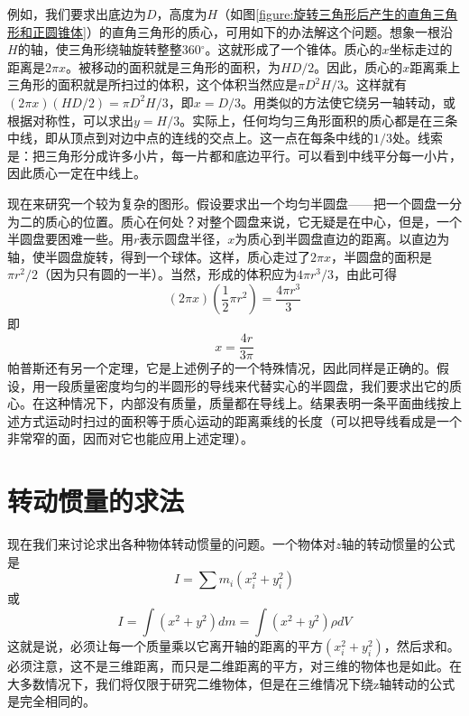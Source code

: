 例如，我们要求出底边为$D$，高度为$H$（如图\ref{figure:旋转三角形后产生的直角三角形和正圆锥体}）的直角三角形的质心，可用如下的办法解这个问题。想象一根沿$H$的轴，使三角形绕轴旋转整整360$^\circ$。这就形成了一个锥体。质心的$x$坐标走过的距离是$2\pi x$。被移动的面积就是三角形的面积，为$HD/2$。因此，质心的$x$距离乘上三角形的面积就是所扫过的体积，这个体积当然应是$\pi D^2H/3$。这样就有$(2\pi x)(HD/2)=\pi D^2H/3$，即$x=D/3$。用类似的方法使它绕另一轴转动，或根据对称性，可以求出$y=H/3$。实际上，任何均匀三角形面积的质心都是在三条中线，即从顶点到对边中点的连线的交点上。这一点在每条中线的$1/3$处。线索是：把三角形分成许多小片，每一片都和底边平行。可以看到中线平分每一小片，因此质心一定在中线上。

现在来研究一个较为复杂的图形。假设要求出一个均匀半圆盘——把一个圆盘一分为二的质心的位置。质心在何处？对整个圆盘来说，它无疑是在中心，但是，一个半圆盘要困难一些。用$r$表示圆盘半径，$x$为质心到半圆盘直边的距离。以直边为轴，使半圆盘旋转，得到一个球体。这样，质心走过了$2\pi x$，半圆盘的面积是$\pi r^2/2$（因为只有圆的一半）。当然，形成的体积应为$4\pi r^3/3$，由此可得
\begin{equation*}
    (2\pi x)\left (\frac{1}{2} \pi r^2 \right ) = \frac{4 \pi r^3}{3}
\end{equation*}
即
\begin{equation*}
    x=\frac{4r}{3\pi}
\end{equation*}
帕普斯还有另一个定理，它是上述例子的一个特殊情况，因此同样是正确的。假设，用一段质量密度均匀的半圆形的导线来代替实心的半圆盘，我们要求出它的质心。在这种情况下，内部没有质量，质量都在导线上。结果表明一条平面曲线按上述方式运动时扫过的面积等于质心运动的距离乘线的长度（可以把导线看成是一个非常窄的面，因而对它也能应用上述定理）。

\section{转动惯量的求法}

现在我们来讨论求出各种物体转动惯量的问题。一个物体对$z$轴的转动惯量的公式是
\begin{equation*}
    I=\sum m_i (x_i^2+y_i^2)
\end{equation*}
或
\begin{equation}
    \label{Eq:I:19:4}
    I=\int (x^2+y^2)dm = \int (x^2+y^2)\rho dV
\end{equation}
这就是说，必须让每一个质量乘以它离开轴的距离的平方$(x_i^2+y_i^2)$，然后求和。必须注意，这不是三维距离，而只是二维距离的平方，对三维的物体也是如此。在大多数情况下，我们将仅限于研究二维物体，但是在三维情况下绕z轴转动的公式是完全相同的。

